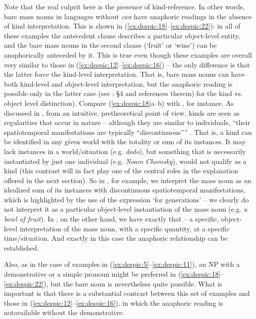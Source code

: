 \documentclass[output=paper,
modfonts
]{langscibook}
\begin{document}
	Note that the real culprit here is the presence of kind-reference. In other
	words, bare mass nouns in languages without  \textit{can} have anaphoric readings in the
	absence of kind interpretation. This is shown in (\ref{ex:despic:18}--\ref{ex:despic:22}): in all of these examples the antecedent
	clause describes a particular object-level entity, and the bare mass nouns in the second clause
	(`fruit' or `wine') can be anaphorically anteceded by it. This is true even though these examples
	are overall very similar to those in (\ref{ex:despic:12}--\ref{ex:despic:16}) -- the only difference is that the latter force the
	kind-level interpretation. 
	That is, bare mass nouns can have both kind-level and object-level interpretation, but the anaphoric reading is possible only in the latter case (see \citealt{Chierchia1998}: \S4 and references therein) for the kind vs. object level distinction). Compare (\ref{ex:despic:18}a--b) with , for instance. As discussed in \citet{Chierchia1998}, from an intuitive, pretheoretical point of view, kinds are seen as regularities that occur in nature -- although they are similar to individuals, ``their spatiotemporal manifestations are typically ``discontinuous'''' \citep[348]{Chierchia1998}. That is, a kind can be identified in any given world with the totality or sum of its instances. It may lack instances in a world/situation (e.g. \textit{dodo}), but something that is necessarily instantiated by just one individual (e.g. \textit{Noam Chomsky}), would not qualify as a kind (this contrast will in fact play one of the central roles in the explanation offered in the next section). So in , for example, we interpret the mass noun as an idealized sum of its instances with discontinuous spatiotemporal manifestations, which is highlighted by the use of the expression `for generations' -- we clearly do not interpret it as a particular object-level instantiation of the mass noun (e.g. \textit{a bowl of fruit}). In , on the other hand, we have exactly that -- a specific, object-level interpretation of the mass noun, with a specific quantity, at a specific time/situation. And exactly in this case the anaphoric relationship can be established. 
	
	Also, as in the case of examples in (\ref{ex:despic:5}--\ref{ex:despic:11}), an NP with a demonstrative or a simple pronoun might be preferred in (\ref{ex:despic:18}--\ref{ex:despic:22}), but the bare noun is nevertheless quite possible. What is important is that there is a substantial contrast between this set of examples and those in (\ref{ex:despic:12}--\ref{ex:despic:16}), in which the anaphoric reading is not\largerpage available without the demonstrative. \newpage 
	
\end{document}
